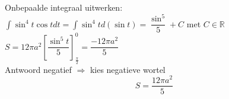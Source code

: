 \documentclass[a4paper]{article}
\newcommand{\bint}{\displaystyle\int\limits}
\begin{document}
Onbepaalde integraal uitwerken:\\

$\bint \sin^4t \cos t dt = \bint \sin^4 t d(\sin t) = \dfrac{\sin^5}{5} + C$ met $C \in \mathbb{R}$\\

$S= 12\pi a^2 \left[\dfrac{\sin^5t}{5}\right]_{\tfrac{\pi}{2}}^0 = \dfrac{-12 \pi a^2}{5}$\\

Antwoord negatief $\Rightarrow$ kies negatieve wortel
$$S = \dfrac{12 \pi a^2}{5}$$


\begin{thebibliography}{999}
\end{thebibliography}
\end{document}
